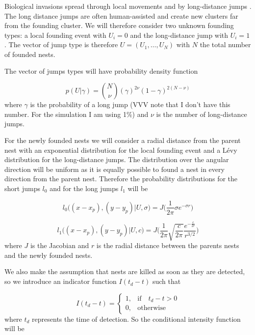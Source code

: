 \documentclass[11pt,a4paper]{article}
\begin{document}
Biological invasions spread through local movements and by long-distance jumps \cite{Suarez}. The long distance jumps are often human-assisted and create new clusters far from the founding cluster. We will therefore consider two unknown founding types: a local founding event with $U_i = 0$ and the long-distance jump with $U_i = 1$. The vector of jump type is therefore $U = (U_1, \dots, U_N)$ with $N$ the total number of founded nests.

The vector of jumps types will have probability density function

\begin{equation*}
    p(U| \gamma ) = {N \choose \nu}(\gamma)^{2\nu}(1 - \gamma)^{2(N - \nu)}
\end{equation*}
where $\gamma$ is the probability of a long jump (VVV note that I don't have this number. For the simulation I am using 1\%) and $\nu$ is the number of long-distance jumps.

For the newly founded nests we will consider a radial distance from the parent nest with an exponential distribution for the local founding event and a L\'evy distribution for the long-distance jumps. The distribution over the angular direction will be uniform as it is equally possible to found a nest in every direction from the parent nest. Therefore the probability distributions for the short jumps $l_0$ and for the long jumps $l_1$ will be

\begin{equation*}
    l_0\Big((x - x_p), (y - y_p) | U, \sigma \Big)= J \bigg(\frac{1}{2 \pi} \sigma e^{- \sigma r}\bigg)
\end{equation*}

\begin{equation*}
    l_1\Big((x - x_p), (y - y_p) | U, c \Big)= J \bigg(\frac{1}{2 \pi} \sqrt{\frac{c}{2 \pi}} \frac{e^{- \frac{c}{ 2 r}}}{r^{3/2}}\bigg)
\end{equation*}
where $J$ is the Jacobian and $r$ is the radial distance between the parents nests and the newly founded nests.

We also make the assumption that nests are killed as soon as they are detected, so we introduce an indicator function $I(t_d - t)$ such that

\begin{equation*}
    I (t_d - t) =
    \begin{cases}
        1, & \mbox{if} \quad t_d -  t> 0 \\
        0, & \mbox{otherwise}
    \end{cases}
\end{equation*}
where $t_d$ represents the time of detection. So the conditional intensity function will be
\end{document}
